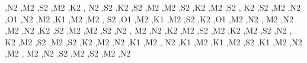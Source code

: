 \begin{DoxyCompactItemize}
\textquotesingle{},\textquotesingle{}N2 \textquotesingle{},\textquotesingle{}M2 \textquotesingle{},\textquotesingle{}S2 \textquotesingle{},\textquotesingle{}M2 \textquotesingle{},\textquotesingle{}K2 \textquotesingle{}, \textquotesingle{}N2 \textquotesingle{},\textquotesingle{}S2 \textquotesingle{},\textquotesingle{}K2 \textquotesingle{},\textquotesingle{}S2 \textquotesingle{},\textquotesingle{}M2 \textquotesingle{},\textquotesingle{}M2 \textquotesingle{},\textquotesingle{}S2 \textquotesingle{},\textquotesingle{}K2 \textquotesingle{},\textquotesingle{}M2 \textquotesingle{},\textquotesingle{}S2 \textquotesingle{}, \textquotesingle{}K2 \textquotesingle{},\textquotesingle{}S2 \textquotesingle{},\textquotesingle{}M2 \textquotesingle{},\textquotesingle{}N2 \textquotesingle{},\textquotesingle{}O1 \textquotesingle{},\textquotesingle{}N2 \textquotesingle{},\textquotesingle{}M2 \textquotesingle{},\textquotesingle{}K1 \textquotesingle{},\textquotesingle{}M2 \textquotesingle{},\textquotesingle{}M2 \textquotesingle{}, \textquotesingle{}S2 \textquotesingle{},\textquotesingle{}O1 \textquotesingle{},\textquotesingle{}M2 \textquotesingle{},\textquotesingle{}K1 \textquotesingle{},\textquotesingle{}M2 \textquotesingle{},\textquotesingle{}S2 \textquotesingle{},\textquotesingle{}K2 \textquotesingle{},\textquotesingle{}O1 \textquotesingle{},\textquotesingle{}M2 \textquotesingle{},\textquotesingle{}N2 \textquotesingle{}, \textquotesingle{}M2 \textquotesingle{},\textquotesingle{}N2 \textquotesingle{},\textquotesingle{}M2 \textquotesingle{},\textquotesingle{}N2 \textquotesingle{},\textquotesingle{}K2 \textquotesingle{},\textquotesingle{}S2 \textquotesingle{},\textquotesingle{}M2 \textquotesingle{},\textquotesingle{}M2 \textquotesingle{},\textquotesingle{}S2 \textquotesingle{},\textquotesingle{}N2 \textquotesingle{}, \textquotesingle{}M2 \textquotesingle{},\textquotesingle{}N2 \textquotesingle{},\textquotesingle{}K2 \textquotesingle{},\textquotesingle{}M2 \textquotesingle{},\textquotesingle{}S2 \textquotesingle{},\textquotesingle{}M2 \textquotesingle{},\textquotesingle{}K2 \textquotesingle{},\textquotesingle{}M2 \textquotesingle{},\textquotesingle{}S2 \textquotesingle{},\textquotesingle{}N2 \textquotesingle{}, \textquotesingle{}K2 \textquotesingle{},\textquotesingle{}M2 \textquotesingle{},\textquotesingle{}S2 \textquotesingle{},\textquotesingle{}M2 \textquotesingle{},\textquotesingle{}S2 \textquotesingle{},\textquotesingle{}K2 \textquotesingle{},\textquotesingle{}M2 \textquotesingle{},\textquotesingle{}N2 \textquotesingle{},\textquotesingle{}K1 \textquotesingle{},\textquotesingle{}M2 \textquotesingle{}, \textquotesingle{}N2 \textquotesingle{},\textquotesingle{}K1 \textquotesingle{},\textquotesingle{}M2 \textquotesingle{},\textquotesingle{}K1 \textquotesingle{},\textquotesingle{}M2 \textquotesingle{},\textquotesingle{}S2 \textquotesingle{},\textquotesingle{}K1 \textquotesingle{},\textquotesingle{}M2 \textquotesingle{},\textquotesingle{}N2 \textquotesingle{},\textquotesingle{}M2 \textquotesingle{}, \textquotesingle{}M2 \textquotesingle{},\textquotesingle{}N2 \textquotesingle{},\textquotesingle{}S2 \textquotesingle{},\textquotesingle{}M2 \textquotesingle{},\textquotesingle{}S2 \textquotesingle{},\textquotesingle{}M2 \textquotesingle{},\textquotesingle{}N2 
\end{DoxyCompactItemize}
